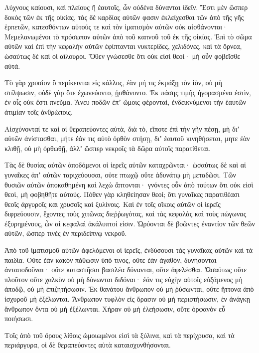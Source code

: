 {\par }{\PP {}Λύχνους καίουσι, καὶ πλείους ἢ ἑαυτοῖς, ὧν οὐδένα δύνανται ἰδεῖν.
Ἔστι μὲν ὥσπερ δοκὸς τῶν ἐκ τῆς οἰκίας, τὰς δὲ καρδίας αὐτῶν φασιν ἐκλείχεσθαι τῶν ἀπὸ τῆς γῆς ἑρπετῶν, κατεσθόντων αὐτούς τε καὶ τὸν ἱματισμὸν αὐτῶν οὐκ αἰσθάνονται·
Μεμελανωμένοι τὸ πρόσωπον αὐτῶν ἀπὸ τοῦ καπνοῦ τοῦ ἐκ τῆς οἰκίας.
Ἐπὶ τὸ σῶμα αὐτῶν καὶ ἐπὶ τὴν κεφαλὴν αὐτῶν ἐφίπτανται νυκτερίδες, χελιδόνες, καὶ τὰ ὄρνεα, ὡσαύτως δὲ καὶ οἱ αἴλουροι.
Ὅθεν γνώσεσθε ὅτι οὐκ εἰσὶ θεοί· μὴ οὖν φοβεῖσθε αὐτά.
\par }{\PP {}Τὸ γὰρ χρυσίον ὃ περίκεινται εἰς κάλλος, ἐὰν μή τις ἐκμάξῃ τὸν ἰὸν, οὐ μὴ στίλψωσιν, οὐδὲ γὰρ ὅτε ἐχωνεύοντο, ᾐσθάνοντο.
Ἐκ πάσης τιμῆς ἠγορασμένα ἐστὶν, ἐν οἷς οὐκ ἔστι πνεῦμα.
Ἄνευ ποδῶν ἐπʼ ὤμοις φέρονταὶ, ἐνδεικνύμενοι τὴν ἑαυτῶν ἀτιμίαν τοῖς ἀνθρώποις.
\par }{\PP {}Αἰσχύνονταί τε καὶ οἱ θεραπεύοντες αὐτὰ, διὰ τὸ, εἴποτε ἐπὶ τὴν γῆν πέσῃ, μὴ διʼ αὐτῶν ἀνίστασθαι, μήτε ἐάν τις αὐτὸ ὀρθὸν στήσῃ, διʼ ἑαυτοῦ κινηθήσεται, μητε ἐὰν κλιθῇ, οὐ μὴ ὀρθωθῇ, ἀλλʼ ὥσπερ νεκροῖς τὰ δῶρα αὐτοῖς παρατίθεται.
\par }{\PP {}Τὰς δὲ θυσίας αὐτῶν ἀποδόμενοι οἱ ἱερεῖς αὐτῶν καταχρῶνται· ὡσαύτως δὲ καὶ αἱ γυναῖκες ἀπʼ αὐτῶν ταριχεύουσαι, οὐτε πτωχῷ οὔτε ἀδυνάτῳ μὴ μεταδῶσι.
Τῶν θυσιῶν αὐτῶν ἀποκαθημένη καὶ λεχὼ ἅπτονται· γνόντες οὖν ἀπὸ τούτων ὅτι οὐκ εἰσὶ θεοὶ, μὴ φοβηθῆτε αὐτούς.
Πόθεν γὰρ κληθείησαν θεοί; ὅτι γυναῖκες παρατιθέασι θεοῖς ἀργυροῖς και χρυσοῖς καὶ ξυλίνοις.
Καὶ ἐν τοῖς οἴκοις αὐτῶν οἱ ἱερεῖς διφρεύουσιν, ἔχοντες τοὺς χιτῶνας διεῤῥωγότας, καὶ τὰς κεφαλὰς καὶ τοὺς πώγωνας ἐξυρημένους, ὧν αἱ κεφαλαὶ ἀκάλυπτοί εἰσιν.
Ὠρύονται δὲ βοῶντες ἐναντίον τῶν θεῶν αὐτῶν, ὥσπερ τινὲς ἐν περιδείπνῳ νεκροῦ.
\par }{\PP {}Ἀπὸ τοῦ ἱματισμοῦ αὐτῶν ἀφελόμενοι οἱ ἱερεῖς, ἐνδύσουσι τὰς γυναῖκας αὐτῶν καὶ τὰ παιδία.
Οὔτε ἐὰν κακὸν πάθωσιν ὑπό τινος, οὔτε ἐὰν ἀγαθὸν, δυνήσονται ἀνταποδοῦναι· οὔτε καταστῆσαι βασιλέα δύνανται, οὔτε ἀφελέσθαι.
Ὡσαύτως οὔτε πλοῦτον οὔτε χαλκὸν οὐ μὴ δύνωνται διδόναι· ἐάν τις εὐχὴν αὐτοῖς εὐξάμενος μὴ ἀποδῷ, οὐ μὴ ἐπιζητήσωσιν.
Ἐκ θανάτου ἄνθρωπον οὐ μὴ ῥύσωνται, οὔτε ἥττονα ἀπὸ ἰσχυροῦ μὴ ἐξέλωνται.
Ἄνθρωπον τυφλὸν εἰς ὅρασιν οὐ μὴ περιστήσωσιν, ἐν ἀνάγκῃ ἄνθρωπον ὄντα οὐ μὴ ἐξέλωνται.
Χήραν οὐ μὴ ἐλεήσωσιν, οὔτε ὀρφανὸν εὖ ποιήσωσι.
\par }{\PP {}Τοῖς ἀπὸ τοῦ ὄρους λίθοις ὡμοιωμὲνοι εἰσὶ τὰ ξύλινα, καὶ τὰ περίχρυσα, καὶ τὰ περιάργυρα, οἱ δὲ θεραπεύοντες αὐτὰ καταισχυνθήσονται.
}

